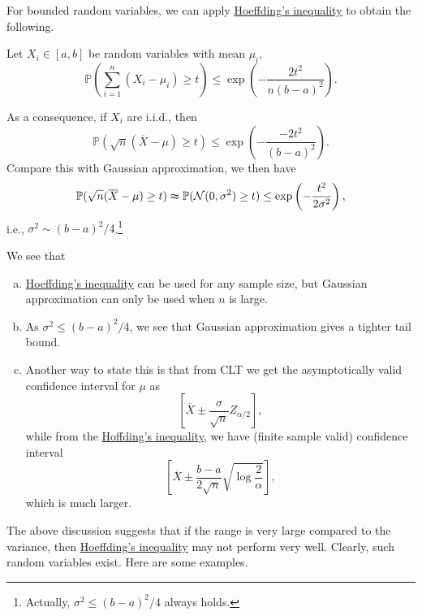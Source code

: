 For bounded random variables, we can apply \hyperref[thm:Hoeffding-inequality]{Hoeffding's inequality} to obtain the following.

\begin{corollary}
	Let \(X_i \in [a, b]\) be random variables with mean \(\mu _i\),
	\[
		\mathbb{P} \left( \sum_{i=1}^{n} (X_i - \mu _i) \geq t \right)  \leq \exp (- \frac{2t^{2} }{n(b-a)^2}).
	\]
\end{corollary}

As a consequence, if \(X_i\) are i.i.d., then
\[
	\mathbb{P} (\sqrt{n} (\overline{X} - \mu ) \geq t) \leq \exp \left( -\frac{-2t^{2} }{(b-a)^{2} } \right).
\]
Compare this with Gaussian approximation, we then have
\[
	\mathbb{P} (\sqrt{n} (\overline{X} - \mu ) \geq t) \thickapprox \mathbb{P} (\mathcal{N} (0, \sigma ^{2} ) \geq t)	 \leq \exp \left( - \frac{t^2}{2 \sigma ^{2} } \right) ,
\]
i.e., \(\sigma ^{2} \sim (b-a)^2 / 4\).\footnote{Actually, \(\sigma ^{2} \leq (b-a)^{2} / 4\) always holds.}

\begin{remark}
	We see that
	\begin{enumerate}[(a)]
		\item \hyperref[thm:Hoeffding-inequality]{Hoeffding's inequality} can be used for any sample size, but Gaussian approximation can only be used when \(n\) is large.
		\item As \(\sigma ^{2} \leq (b - a)^{2} / 4\), we see that Gaussian approximation gives a tighter tail bound.
		\item\label{rmk:Hoeffding-confidence-interval} Another way to state this is that from CLT we get the asymptotically valid confidence interval for \(\mu \) as
		      \[
			      \left[  \overline{X} \pm  \frac{\sigma }{\sqrt{n}} Z_{\alpha / 2}\right],
		      \]
		      while from the \hyperref[thm:Hoeffding-inequality]{Hoffding's inequality}, we have (finite sample valid) confidence interval
		      \[
			      \left[ \overline{X} \pm \frac{b-a}{2 \sqrt{n} } \sqrt{\log \frac{2}{\alpha }}  \right] ,
		      \]
		      which is much larger.
	\end{enumerate}
\end{remark}

The above discussion suggests that if the range is very large compared to the variance, then \hyperref[thm:Hoeffding-inequality]{Hoeffding's inequality} may not perform very well. Clearly, such random variables exist. Here are some examples.

